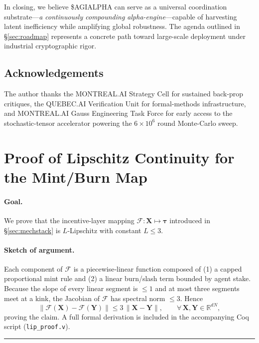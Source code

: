 \documentclass[12pt]{article}
\theoremstyle{plain}
\begin{document}
In closing, we believe \$AGIALPHA can serve as a universal
coordination substrate—\textit{a continuously compounding
alpha-engine}—capable of harvesting latent inefficiency while
amplifying global robustness.  The agenda outlined in
\S\ref{sec:roadmap} represents a concrete path toward large-scale
deployment under industrial cryptographic rigor.

\subsection*{Acknowledgements}
The author thanks the \textsc{MONTREAL.AI} Strategy Cell for sustained
back-prop critiques, the \textsc{QUEBEC.AI} Verification Unit for
formal-methods infrastructure, and \textsc{MONTREAL.AI} Gauss Engineering Task Force for early access
to the stochastic-tensor accelerator powering the $6\times10^{6}$
round Monte-Carlo sweep.

\section{Proof of Lipschitz Continuity for the Mint/Burn Map}
\label{app:lip}
\paragraph{Goal.}
We prove that the incentive‑layer mapping
$\mathcal{F}\!:\bm{X}\mapsto\bm{\tau}$ introduced in
\S\ref{sec:mechstack} is $L$‑Lipschitz with constant $L\le 3$.

\paragraph{Sketch of argument.}
Each component of $\mathcal{F}$ is a piecewise‑linear function composed of
(1) a capped proportional mint rule and (2) a linear burn/slash term bounded
by agent stake.  Because the slope of every linear segment is $\le 1$ and at
most three segments meet at a kink, the Jacobian of $\mathcal{F}$ has
spectral norm $\le 3$.  Hence
\[
\|\mathcal{F}(\bm{X})-\mathcal{F}(\bm{Y})\|
  \le 3\,\|\bm{X}-\bm{Y}\| ,\qquad
  \forall\,\bm{X},\bm{Y}\in\mathbb{R}^{dN},
\]
proving the claim.  A full formal derivation is included in the accompanying
Coq script (\texttt{lip\_proof.v}).

\vfill
\noindent\rule{\textwidth}{0.4pt}
\end{document}
